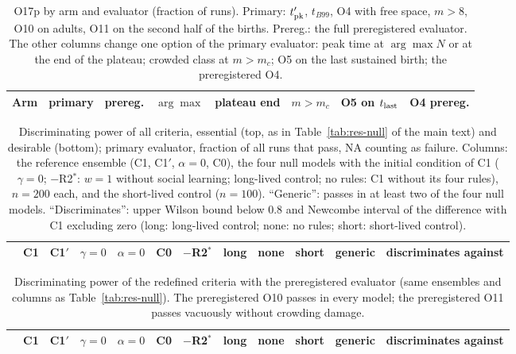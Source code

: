 \begin{table}[ht]
  \centering
  \caption{O17p by arm and evaluator (fraction of runs). Primary: $t'_{\rm pk}$, $t_{B99}$, O4 with free space,
  $m>8$, O10 on adults, O11 on the second half of the births. Prereg.: the full preregistered evaluator. The other columns
  change one option of the primary evaluator: peak time at $\arg\max N$ or at the end of the plateau; crowded class
  at $m>m_c$; O5 on the last sustained birth; the preregistered O4.}
  \label{tab:res-rescoring}
  \scriptsize
  \setlength{\tabcolsep}{4pt}
  \begin{tabular}{@{}lccccccc@{}}
    \toprule
    Arm & primary & prereg. & $\arg\max$ & plateau end & $m>m_c$ & O5 on $t_{\rm last}$ & O4 prereg. \\
    \midrule
    
  \end{tabular}
\end{table}

\begin{table}[ht]
\centering
\caption{Discriminating power of all criteria, essential (top, as in Table~\ref{tab:res-null} of the main text) and
desirable (bottom); primary evaluator, fraction of all runs that pass, NA counting as failure. Columns: the
reference ensemble (\textsf{C1}, \textsf{C1}$'$, $\alpha=0$, \textsf{C0}), the four null models with the initial
condition of \textsf{C1} ($\gamma=0$; $-$R2$^*$: $w=1$ without social learning; long-lived control; no rules: \textsf{C1} without its four
rules), $n=200$ each, and the short-lived control ($n=100$). ``Generic'': passes in at least two of the four null models.
``Discriminates'': upper Wilson bound below 0.8 and Newcombe interval of the difference with \textsf{C1} excluding
zero (long: long-lived control; none: no rules; short: short-lived control).}
\label{tab:res-null-full}
\footnotesize
\setlength{\tabcolsep}{3.2pt}
\begin{tabular}{@{}lccccccccccl@{}}
\toprule
& \textsf{C1} & \textsf{C1}$'$ & $\gamma{=}0$ & $\alpha{=}0$ & \textsf{C0} & $-$R2$^*$ & long & none & short & generic & discriminates against \\
\midrule

\end{tabular}
\end{table}

\begin{table}[ht]
  \centering
  \caption{Discriminating power of the redefined criteria with the preregistered evaluator (same ensembles and columns
  as Table~\ref{tab:res-null}). The preregistered O10 passes in every model; the preregistered O11 passes vacuously without
  crowding damage.}
  \label{tab:res-null-v1}
  \footnotesize
  \setlength{\tabcolsep}{3.2pt}
  \begin{tabular}{@{}lccccccccccl@{}}
    \toprule
    & \textsf{C1} & \textsf{C1}$'$ & $\gamma{=}0$ & $\alpha{=}0$ & \textsf{C0} & $-$R2$^*$ & long & none & short & generic & discriminates against \\
    \midrule
    
  \end{tabular}
\end{table}


